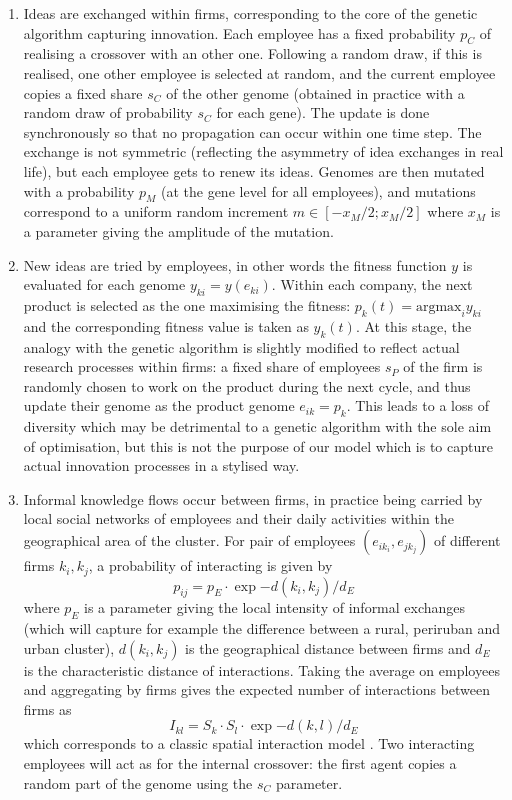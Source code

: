 \documentclass[letterpaper]{article}
\begin{document}
\begin{enumerate}
    \item Ideas are exchanged within firms, corresponding to the core of the genetic algorithm capturing innovation. Each employee has a fixed probability $p_C$ of realising a crossover with an other one. Following a random draw, if this is realised, one other employee is selected at random, and the current employee copies a fixed share $s_C$ of the other genome (obtained in practice with a random draw of probability $s_C$ for each gene). The update is done synchronously so that no propagation can occur within one time step. The exchange is not symmetric (reflecting the asymmetry of idea exchanges in real life), but each employee gets to renew its ideas. Genomes are then mutated with a probability $p_M$ (at the gene level for all employees), and mutations correspond to a uniform random increment $m \in \left[ -x_M/2 ; x_M/2 \right]$ where $x_M$ is a parameter giving the amplitude of the mutation.
    \item New ideas are tried by employees, in other words the fitness function $y$ is evaluated for each genome $y_{ki} = y(e_{ki})$. Within each company, the next product is selected as the one maximising the fitness: $p_k (t) = \textrm{argmax}_i y_{ki}$ and the corresponding fitness value is taken as $y_k (t)$. At this stage, the analogy with the genetic algorithm is slightly modified to reflect actual research processes within firms: a fixed share of employees $s_P$ of the firm is randomly chosen to work on the product during the next cycle, and thus update their genome as the product genome $e_{ik} = p_k$. This leads to a loss of diversity which may be detrimental to a genetic algorithm with the sole aim of optimisation, but this is not the purpose of our model which is to capture actual innovation processes in a stylised way.
    \item Informal knowledge flows occur between firms, in practice being carried by local social networks of employees and their daily activities within the geographical area of the cluster. For pair of employees $(e_{i k_i}, e_{j k_j})$ of different firms $k_i,k_j$, a probability of interacting is given by
    \[
    p_{ij} = p_E \cdot \exp{ - d(k_i,k_j) / d_E}
    \]
    where $p_E$ is a parameter giving the local intensity of informal exchanges (which will capture for example the difference between a rural, periruban and urban cluster), $d(k_i,k_j)$ is the geographical distance between firms and $d_E$ is the characteristic distance of interactions. Taking the average on employees and aggregating by firms gives the expected number of interactions between firms as
    \[
    I_{kl} = S_k \cdot S_l \cdot \exp{ - d(k,l) / d_E}
    \]
    which corresponds to a classic spatial interaction model \citep{wilson1975some}. Two interacting employees will act as for the internal crossover: the first agent copies a random part of the genome using the $s_C$ parameter.
\end{enumerate}
\end{document}

